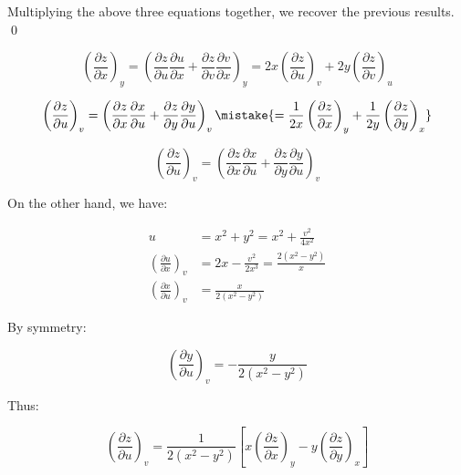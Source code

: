 \documentclass[12pt]{article}
\begin{document}
Multiplying the above three equations together, we recover the previous results.
\qed




\begin{equation}
    \left( \frac{\partial z}{\partial x} \right)_{y} = \left( \frac{\partial z}{\partial u} \frac{\partial u}{\partial x} + \frac{\partial z}{\partial v} \frac{\partial v}{\partial x} \right)_{y} = 2x \left( \frac{\partial z}{\partial u} \right)_{v} + 2y \left( \frac{\partial z}{\partial v} \right)_{u}
\end{equation}


\begin{equation}
    \left( \frac{\partial z}{\partial u} \right)_{v} = \left( \frac{\partial z}{\partial x} \frac{\partial x}{\partial u} + \frac{\partial z}{\partial y} \frac{\partial y}{\partial u} \right)_{v} \mistake{= \frac{1}{2x} \left( \frac{\partial z}{\partial x} \right)_{y} + \frac{1}{2y} \left( \frac{\partial z}{\partial y} \right)_{x}}
\end{equation}

\begin{correction}
    \begin{equation}
        \left( \frac{\partial z}{\partial u} \right)_{v} = \left( \frac{\partial z}{\partial x} \frac{\partial x}{\partial u} + \frac{\partial z}{\partial y} \frac{\partial y}{\partial u} \right)_{v}
    \end{equation}

    On the other hand, we have:

    \begin{equation}
        \begin{split}
            u &= x^{2} + y^{2} = x^{2} + \frac{v^{2}}{4x^{2}} \\
            \left( \frac{\partial u}{\partial x} \right)_{v} &= 2x - \frac{v^{2}}{2x^{3}} = \frac{2(x^{2} - y^{2})}{x} \\
            \left( \frac{\partial x}{\partial u} \right)_{v} &= \frac{x}{2(x^{2} - y^{2})}
        \end{split}
    \end{equation}

    By symmetry:

    \begin{equation}
        \left( \frac{\partial y}{\partial u} \right)_{v} = -\frac{y}{2(x^{2} - y^{2})}
    \end{equation}

    Thus:

    \begin{equation}
        \left( \frac{\partial z}{\partial u} \right)_{v} = \frac{1}{2(x^{2} - y^{2})} \left[ x \left( \frac{\partial z}{\partial x} \right)_{y} - y \left( \frac{\partial z}{\partial y} \right)_{x} \right]
    \end{equation}
\end{correction}
\end{document}

